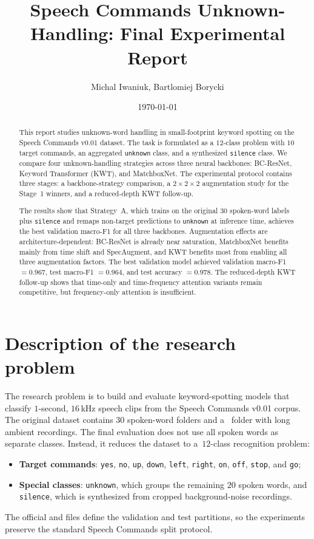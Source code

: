 \documentclass[11pt]{article}
\title{Speech Commands Unknown-Handling: Final Experimental Report}
\author{Michal Iwaniuk, Bartlomiej Borycki}
\date{\today}
\begin{document}
\maketitle

\begin{abstract}
\label{sec:abstract}
This report studies unknown-word handling in small-footprint keyword spotting on the Speech Commands v0.01 dataset. The task is formulated as a \(12\)-class problem with \(10\) target commands, an aggregated \texttt{unknown} class, and a synthesized \texttt{silence} class. We compare four unknown-handling strategies across three neural backbones: BC-ResNet, Keyword Transformer (KWT), and MatchboxNet. The experimental protocol contains three stages: a backbone-strategy comparison, a \(2\times2\times2\) augmentation study for the Stage~1 winners, and a reduced-depth KWT follow-up.

The results show that Strategy~A, which trains on the original \(30\) spoken-word labels plus \texttt{silence} and remaps non-target predictions to \texttt{unknown} at inference time, achieves the best validation macro-F1 for all three backbones. Augmentation effects are architecture-dependent: BC-ResNet is already near saturation, MatchboxNet benefits mainly from time shift and SpecAugment, and KWT benefits most from enabling all three augmentation factors. The best validation model achieved validation macro-F1 \(=0.967\), test macro-F1 \(=0.964\), and test accuracy \(=0.978\). The reduced-depth KWT follow-up shows that time-only and time-frequency attention variants remain competitive, but frequency-only attention is insufficient.
\end{abstract}


\section{Description of the research problem}
\label{sec:problem}
The research problem is to build and evaluate keyword-spotting models that classify \(1\)-second, \(16\)\,kHz speech clips from the Speech Commands v0.01 corpus. The original dataset contains \(30\) spoken-word folders and a~ folder with long ambient recordings. The final evaluation does not use all spoken words as separate classes. Instead, it reduces the dataset to a~\(12\)-class recognition problem:
\begin{itemize}[leftmargin=*]
    \item \textbf{Target commands}: \texttt{yes}, \texttt{no}, \texttt{up}, \texttt{down}, \texttt{left}, \texttt{right}, \texttt{on}, \texttt{off}, \texttt{stop}, and \texttt{go};
    \item \textbf{Special classes}: \texttt{unknown}, which groups the remaining \(20\) spoken words, and \texttt{silence}, which is synthesized from cropped background-noise recordings.
\end{itemize}
The official  and  files define the validation and test partitions, so the experiments preserve the standard Speech Commands split protocol.
\end{document}
